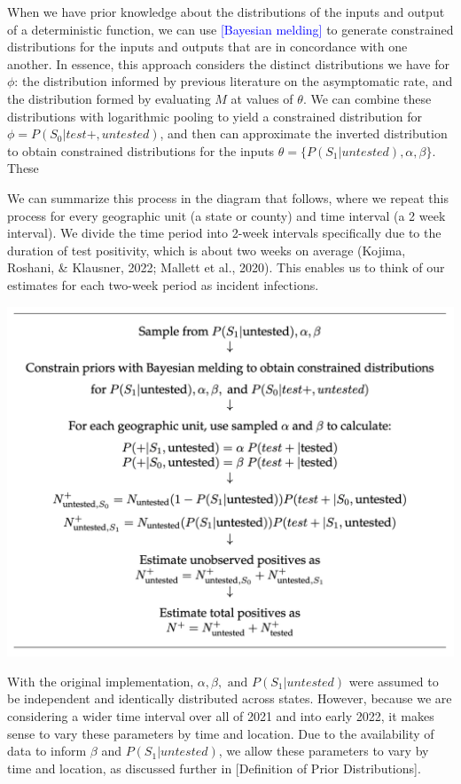 \documentclass[12pt,twoside]{smiththesis}
\begin{document}
When we have prior knowledge about the distributions of the inputs and output of a deterministic function, we can use \textcolor{blue}{[Bayesian melding]} to generate constrained distributions for the inputs and outputs that are in concordance with one another. In essence, this approach considers the distinct distributions we have for \(\phi\): the distribution informed by previous literature on the asymptomatic rate, and the distribution formed by evaluating \(M\) at values of \(\theta\). We can combine these distributions with logarithmic pooling to yield a constrained distribution for \(\phi=P(S_0|test +, untested)\), and then can approximate the inverted distribution to obtain constrained distributions for the inputs \(\theta = \{P(S_1|untested), \alpha, \beta \}\). These

We can summarize this process in the diagram that follows, where we repeat this process for every geographic unit (a state or county) and time interval (a 2 week interval). We divide the time period into 2-week intervals specifically due to the duration of test positivity, which is about two weeks on average (Kojima, Roshani, \& Klausner, 2022; Mallett et al., 2020). This enables us to think of our estimates for each two-week period as incident infections.
\begin{center}\includegraphics[width=0.8\linewidth]{./figure/analysis_diagram} \end{center}

With the original implementation, \(\alpha, \beta, \text{ and } P(S_1|untested)\) were assumed to be independent and identically distributed across states. However, because we are considering a wider time interval over all of 2021 and into early 2022, it makes sense to vary these parameters by time and location. Due to the availability of data to inform \(\beta\) and \(P(S_1|untested)\), we allow these parameters to vary by time and location, as discussed further in {[}Definition of Prior Distributions{]}.
\end{document}
